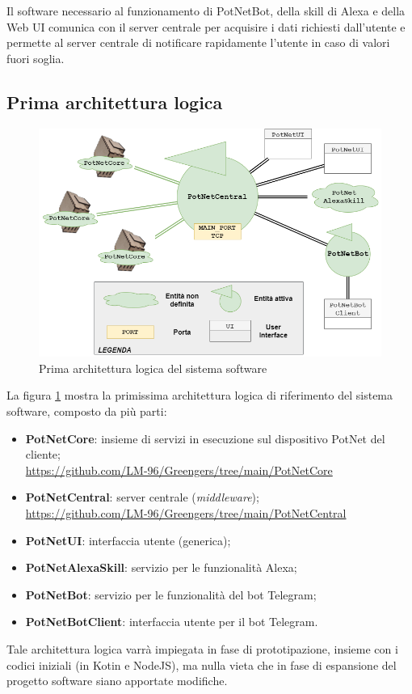 Il software necessario al funzionamento di PotNetBot, della skill di Alexa e della Web UI comunica con il server centrale per acquisire i dati richiesti dall'utente e permette al server centrale di notificare rapidamente l'utente in caso di valori fuori soglia. 

\subsection{Prima architettura logica}
\begin{figure}[h]
	\centering
	\includegraphics[width=\textwidth]{images/logical_arch.png}
	\caption{Prima architettura logica del sistema software}
	\label{fig:logical_arch}
\end{figure}

La figura \ref{fig:logical_arch} mostra la primissima architettura logica di riferimento del sistema software, composto da più parti:
\begin{itemize}
	\item \textbf{PotNetCore}: insieme di servizi in esecuzione sul dispositivo PotNet del cliente;\\
	\url{https://github.com/LM-96/Greengers/tree/main/PotNetCore}
	
	\item \textbf{PotNetCentral}: server centrale (\textit{middleware});\\
	\url{https://github.com/LM-96/Greengers/tree/main/PotNetCentral}
	\item \textbf{PotNetUI}: interfaccia utente (generica);
	
	\item \textbf{PotNetAlexaSkill}: servizio per le funzionalità Alexa;
	
	\item \textbf{PotNetBot}: servizio per le funzionalità del bot Telegram;
	
	\item \textbf{PotNetBotClient}: interfaccia utente per il bot Telegram.
\end{itemize}
Tale architettura logica varrà impiegata in fase di prototipazione, insieme con i codici iniziali (in Kotin e NodeJS), ma nulla vieta che in fase di espansione del progetto software siano apportate modifiche.

